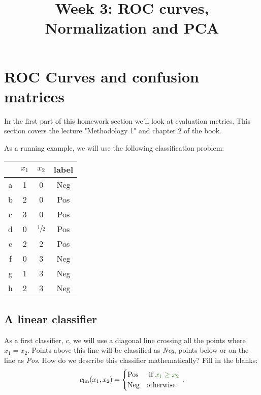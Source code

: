 \documentclass[11pt]{article}
\title{Week 3: ROC curves, Normalization and PCA}
\begin{document}
\maketitle
\section{ROC Curves and confusion matrices}

In the first part of this homework section we'll look at evaluation metrics. This section covers the lecture "Methodology 1" and chapter 2 of the book. 

As a running example, we will use the following classification problem:

\begin{center}
	\begin{tabular}{c c c c}
		& $x_1$ & $x_2$ & label\\
		\hline
		a & 1 & 0 & Neg \\
		b & 2 & 0 & Pos \\
		c & 3 & 0 & Pos \\
		d & 0 & $\sfrac{1}{2}$ & Pos \\
		e & 2 & 2 & Pos \\
		f & 0 & 3 & Neg \\
		g & 1 & 3 & Neg \\
		h & 2 & 3 & Neg \\
		\hline
	\end{tabular}
\end{center}

\subsection{A linear classifier}
	As a first classifier, $c$, we will use a diagonal line crossing all the points where $x_1 = x_2$. Points above this line will be classified as \emph{Neg}, points below or on the line as \emph{Pos}. How do we describe this classifier mathematically? Fill in the blanks:
	\[
	c_\text{lin}(x_1, x_2) = \begin{cases} \text{Pos} & \text{ if } \ans{x_1 \geq x_2}{\ldots} \\ \text{Neg} & \text{otherwise}\end{cases}\p
	\]
	
\end{document}
